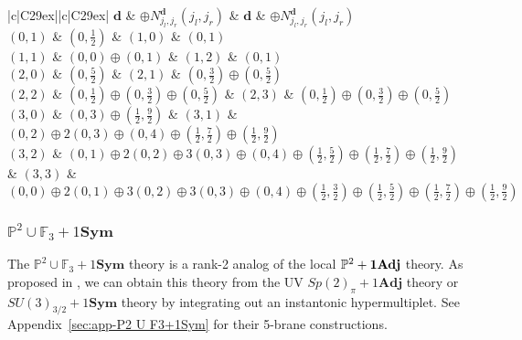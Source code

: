\begin{table}
	\centering
	\begin{tabular}{|c|C{29ex}||c|C{29ex}|} \hline
		$\mathbf{d}$ & $\oplus N_{j_l, j_r}^{\mathbf{d}} (j_l, j_r)$ & $\mathbf{d}$ & $\oplus N_{j_l, j_r}^{\mathbf{d}} (j_l, j_r)$ \\ \hline
		$ (0, 1) $ & $ (0, \frac{1}{2}) $ & $ (1, 0) $ & $ (0, 1) $ \\ \hline
		$ (1, 1) $ & $ (0, 0) \oplus (0, 1) $ & $ (1, 2) $ & $ (0, 1) $ \\ \hline
		$ (2, 0) $ & $ (0, \frac{5}{2}) $ & $ (2, 1) $ & $ (0, \frac{3}{2}) \oplus (0, \frac{5}{2}) $ \\ \hline
		$ (2, 2) $ & $ (0,\frac{1}{2}) \oplus (0,\frac{3}{2}) \oplus (0,\frac{5}{2}) $ & $ (2, 3) $ & $ (0, \frac{1}{2}) \oplus (0, \frac{3}{2}) \oplus (0, \frac{5}{2}) $ \\ \hline
		$ (3, 0) $ & $ (0, 3) \oplus (\frac{1}{2}, \frac{9}{2}) $ & $ (3, 1) $ & $ (0,2) \oplus 2(0,3) \oplus (0,4) \oplus (\frac{1}{2},\frac{7}{2})\oplus (\frac{1}{2},\frac{9}{2}) $ \\ \hline
		$ (3, 2) $ & $ (0,1) \oplus 2(0,2) \oplus 3(0,3) \oplus (0,4) \oplus (\frac{1}{2},\frac{5}{2}) \oplus (\frac{1}{2},\frac{7}{2}) \oplus (\frac{1}{2},\frac{9}{2}) $ & $ (3, 3) $ & $ (0,0) \oplus 2(0,1) \oplus 3(0,2) \oplus 3(0,3) \oplus (0,4) \oplus (\frac{1}{2},\frac{3}{2}) \oplus (\frac{1}{2},\frac{5}{2}) \oplus (\frac{1}{2},\frac{7}{2}) \oplus (\frac{1}{2},\frac{9}{2}) $ \\ \hline
	\end{tabular}
	\caption{BPS spectrum of $ \mathbb{P}^2 \cup \mathbb{F}_6 $ for $ d_i \leq 3 $. Here, $ \mathbf{d} = (d_1, d_2) $ labels the BPS state with charge $ d_1 \ell + d_2 f_2 $.} \label{table:P2-F6}
\end{table}


\subsubsection{\texorpdfstring{$ \mathbb{P}^2 \cup \mathbb{F}_3 + 1\mathbf{Sym} $}{P2 U F3 + 1Sym}}

The $\mathbb{P}^2 \cup \mathbb{F}_3 + 1\mathbf{Sym}$ theory is a rank-2 analog of the local $\mathbb{P}^2+{\bf 1Adj}$ theory. As proposed in \cite{Bhardwaj:2019jtr}, we can obtain this theory from the UV $ Sp(2)_\pi + 1\mathbf{Adj} $ theory or $ SU(3)_{3/2} + 1\mathbf{Sym} $ theory by integrating out an instantonic hypermultiplet. See Appendix~\ref{sec:app-P2 U F3+1Sym} for their 5-brane constructions. 

